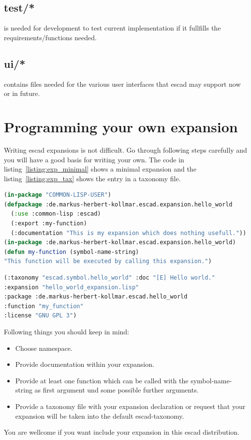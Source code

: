 \documentclass[a4paper, 12pt, openany]{scrbook}
\begin{document}
\subsection{test/*}
 is needed for development to test current implementation if it fullfills the requirements/functions needed.
\subsection{ui/*}
 contains files needed for the various user interfaces that escad may support now or in future.
\section{Programming your own expansion}
Writing escad expansions is not difficult. Go through following steps carefully and you will have a good basis for writing your own. The code in listing~\ref{listing:exp_minimal} shows a minimal expansion and the listing~\ref{listing:exp_tax} shows the entry in a taxonomy file.
\begin{lstlisting}[caption={Minimal expansion code.}, language=Lisp, morekeywords={in-package, use}, label=listing:exp_minimal]
(in-package "COMMON-LISP-USER")
(defpackage :de.markus-herbert-kollmar.escad.expansion.hello_world
  (:use :common-lisp :escad)
  (:export :my-function)
  (:documentation "This is my expansion which does nothing usefull."))
(in-package :de.markus-herbert-kollmar.escad.expansion.hello_world)
(defun my-function (symbol-name-string)
"This function will be executed by calling this expansion.")
\end{lstlisting}
\begin{lstlisting}[caption={Entry in a taxonomy-file.}, language=Lisp, morekeywords={}, label=listing:exp_tax]
(:taxonomy "escad.symbol.hello_world" :doc "[E] Hello world."
:expansion "hello_world_expansion.lisp"
:package :de.markus-herbert-kollmar.escad.hello_world
:function "my_function"
:license "GNU GPL 3")
\end{lstlisting}
Following things you should keep in mind:
\begin{itemize}
\item Choose namespace.
\item Provide documentation within your expansion.
\item Provide at least one function which can be called with the symbol-name-string as first argument und some possible further arguments.
\item Provide a taxonomy file with your expansion declaration or request that your expansion will be taken into the default escad-taxonomy.
\end{itemize}
You are wellcome if you want include your expansion in this escad distribution.

\clearpage %

% 
\printindex


\end{document}
